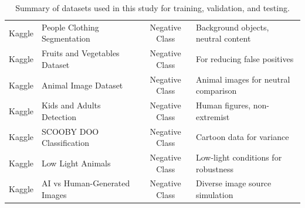 \begin{table}[htbp]
{\begin{tabular}{clcl}
Kaggle & People Clothing Segmentation~\parencite{people_clothing_segmentation_dataset} & Negative Class & Background objects, neutral content \\

Kaggle & Fruits and Vegetables Dataset~\parencite{fruit_and_vegetable_image_recognition_dataset} & Negative Class & For reducing false positives \\

Kaggle & Animal Image Dataset~\parencite{animal_image_dataset} & Negative Class & Animal images for neutral comparison \\

Kaggle & Kids and Adults Detection~\parencite{kids_and_adults_detection_dataset} & Negative Class & Human figures, non-extremist \\

Kaggle & SCOOBY DOO Classification~\parencite{scooby_doo_classification_dataset} & Negative Class & Cartoon data for variance \\

Kaggle & Low Light Animals~\parencite{subrata_sarkar_2025} & Negative Class & Low-light conditions for robustness \\

Kaggle & AI vs Human-Generated Images~\parencite{ai_vs_human_generated_images_dataset} & Negative Class & Diverse image source simulation \\
\bottomrule
\end{tabular}
}
\caption{Summary of datasets used in this study for training, validation, and testing.}
\label{tab:dataset_summary}
\end{table}